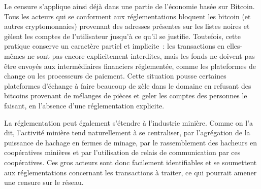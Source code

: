Le censure s'applique ainsi déjà dans une partie de l'économie basée sur Bitcoin. Tous les acteurs qui se conforment aux réglementations bloquent les bitcoin (et autres cryptomonnaies) provenant des adresses présentes sur les listes noires et gèlent les comptes de l'utilisateur jusqu'à ce qu'il se justifie. Toutefois, cette pratique conserve un caractère partiel et implicite~: les transactions en elles-mêmes ne sont pas encore explicitement interdites, mais les fonds ne doivent pas être envoyés aux intermédiaires financiers réglementée, comme les plateformes de change ou les processeurs de paiement. Cette situation pousse certaines plateformes d'échange à faire beaucoup de zèle dans le domaine en refusant des bitcoins provenant de mélanges de pièces et geler les comptes des personnes le faisant, en l'absence d'une réglementation explicite.

La réglementation peut également s'étendre à l'industrie minière. Comme on l'a dit, l'activité minière tend naturellement à se centraliser, par l'agrégation de la puissance de hachage en fermes de minage, par le rassemblement des hacheurs en coopératives minières et par l'utilisation de relais de communication par ces coopératives. Ces gros acteurs sont donc facilement identifiables et se soumettent aux réglementations concernant les transactions à traiter, ce qui pourrait amener une censure sur le réseau.


